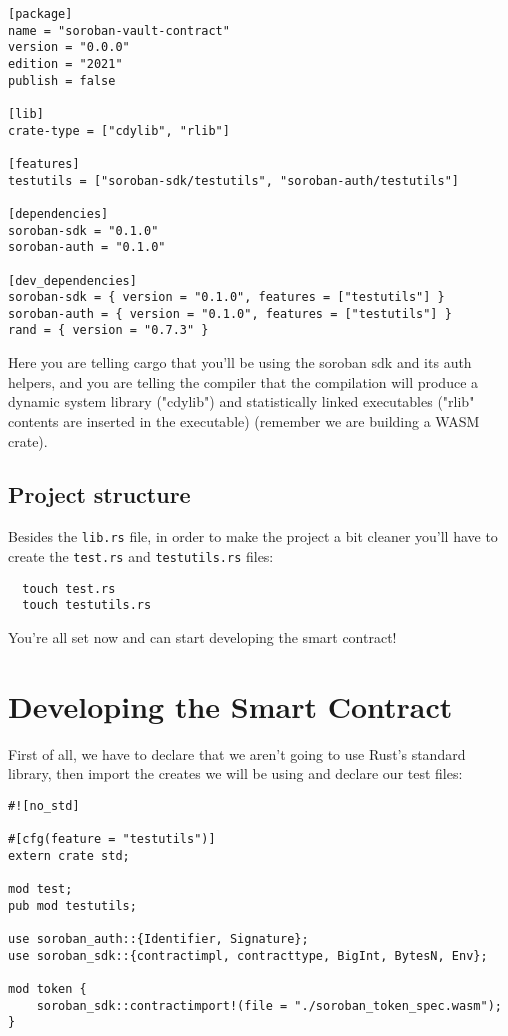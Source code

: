 \documentclass{article}
\newcommand{\inl}[1]{\lstinline{#1}}
\begin{document}
\begin{lstlisting}
[package]
name = "soroban-vault-contract"
version = "0.0.0"
edition = "2021"
publish = false

[lib]
crate-type = ["cdylib", "rlib"]

[features]
testutils = ["soroban-sdk/testutils", "soroban-auth/testutils"]

[dependencies]
soroban-sdk = "0.1.0"
soroban-auth = "0.1.0"

[dev_dependencies]
soroban-sdk = { version = "0.1.0", features = ["testutils"] }
soroban-auth = { version = "0.1.0", features = ["testutils"] }
rand = { version = "0.7.3" }

\end{lstlisting}

Here you are telling cargo that you'll be using the soroban sdk and its auth helpers, and you are telling the compiler that the compilation will produce a dynamic system library ("cdylib") and statistically linked executables ("rlib" contents are inserted in the executable) (remember we are building a WASM crate).

\subsection{Project structure}
Besides the \inl{lib.rs} file, in order to make the project a bit cleaner you'll have to create the \inl{test.rs} and \inl{testutils.rs} files:

\begin{lstlisting}
  touch test.rs
  touch testutils.rs
\end{lstlisting}

You're all set now and can start developing the smart contract!

\section{Developing the Smart Contract}

First of all, we have to declare that we aren't going to use Rust's standard library, then import the creates we will be using and declare our test files:

\begin{lstlisting}
#![no_std]

#[cfg(feature = "testutils")]
extern crate std;

mod test;
pub mod testutils;

use soroban_auth::{Identifier, Signature};
use soroban_sdk::{contractimpl, contracttype, BigInt, BytesN, Env};

mod token {
    soroban_sdk::contractimport!(file = "./soroban_token_spec.wasm");
}

\end{lstlisting}
\end{document}
